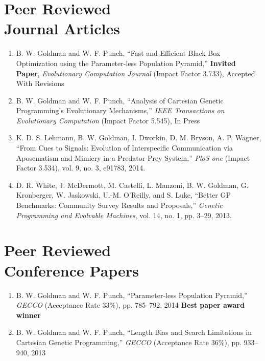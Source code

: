 \documentclass[margin,line]{resume}
\begin{document}
\begin{resume}
    \section{\mysidestyle Peer Reviewed\\Journal Articles}

    \begin{enumerate}
    \item
    B. W. Goldman and W. F. Punch,
    ``Fast and Efficient Black Box Optimization using the Parameter-less Population Pyramid,''
    \textbf{Invited Paper}, \textsl{Evolutionary Computation Journal} (Impact Factor 3.733), Accepted With Revisions

    \item
    B. W. Goldman and W. F. Punch,
    ``Analysis of Cartesian Genetic Programming's Evolutionary Mechanisms,''
    \textsl{IEEE Transactions on Evolutionary Computation} (Impact Factor 5.545), In Press

    \item
    K. D. S. Lehmann,  B. W. Goldman, I. Dworkin, D. M. Bryson, A. P. Wagner,
    ``From Cues to Signals: Evolution of Interspecific Communication via Aposematism and Mimicry in a Predator-Prey System,''
    \textsl{PloS one} (Impact Factor 3.534), vol. 9, no. 3, e91783, 2014.

    \item
    D. R. White, J. McDermott, M. Castelli, L. Manzoni, B. W. Goldman,
    G. Kronberger, W. Jaskowski, U.-M. O'Reilly, and S. Luke,
    ``Better GP Benchmarks: Community Survey Results and Proposals,''
    \textsl{Genetic Programming and Evolvable Machines}, vol. 14, no. 1, pp. 3--29, 2013.    
    \end{enumerate}

    \section{\mysidestyle Peer Reviewed\\Conference Papers}
    \begin{enumerate}
    
    \item
    B. W. Goldman and W. F. Punch,
    ``Parameter-less Population Pyramid,''
    \textsl{GECCO} (Acceptance Rate 33\%), pp. 785--792, 2014
    \textbf{Best paper award winner}
        
    \item
    B. W. Goldman and W. F. Punch,
    ``Length Bias and Search Limitations in Cartesian Genetic Programming,''
    \textsl{GECCO} (Acceptance Rate 36\%), pp. 933--940, 2013


\end{enumerate}
\end{resume}
\end{document}
